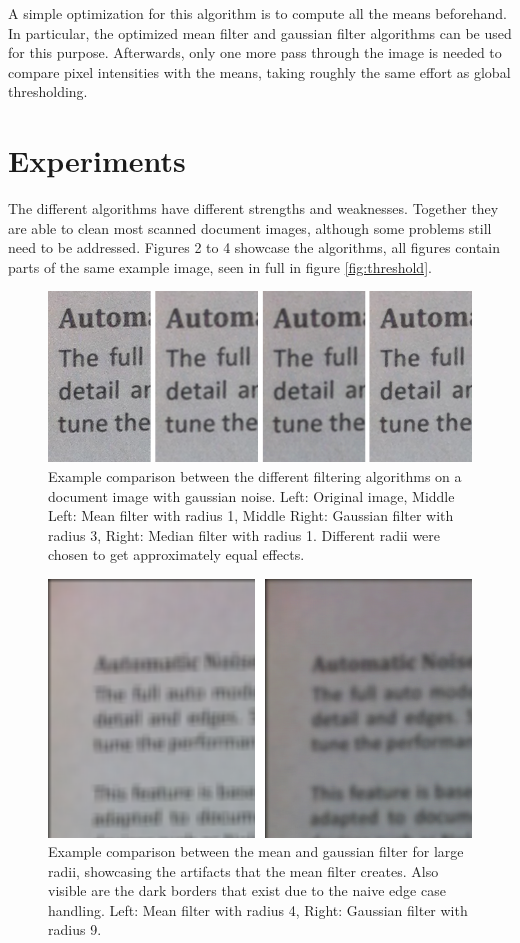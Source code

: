 \documentclass[sigconf]{acmart}
\begin{document}
A simple optimization for this algorithm is to compute all the means beforehand. In particular, the optimized mean filter and gaussian filter algorithms can be used for this purpose. Afterwards, only one more pass through the image is needed to compare pixel intensities with the means, taking roughly the same effort as global thresholding.

\section{Experiments}
The different algorithms have different strengths and weaknesses. Together they are able to clean most scanned document images, although some problems still need to be addressed. Figures 2 to 4 showcase the algorithms, all figures contain parts of the same example image, seen in full in figure \ref{fig:threshold}.

\begin{figure}
  \centering
  \includegraphics[width=\linewidth]{./graphics/filter_comparison_1.png}
  \caption{Example comparison between the different filtering algorithms on a document image with gaussian noise. Left: Original image, Middle Left: Mean filter with radius 1, Middle Right: Gaussian filter with radius 3, Right: Median filter with radius 1. Different radii were chosen to get approximately equal effects.}
  \label{fig:filtercomparison1}
\end{figure}

\begin{figure}
  \centering
  \includegraphics[width=\linewidth]{./graphics/filter_comparison_2.png}
  \caption{Example comparison between the mean and gaussian filter for large radii, showcasing the artifacts that the mean filter creates. Also visible are the dark borders that exist due to the naive edge case handling. Left: Mean filter with radius 4, Right: Gaussian filter with radius 9.}
  \label{fig:filtercomparison2}
\end{figure}
\end{document}
